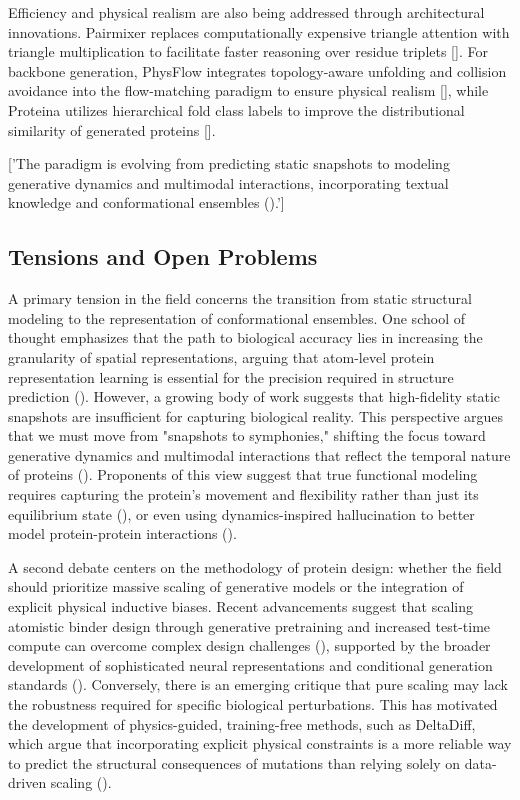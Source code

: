 \documentclass[11pt]{article}
\begin{document}
Efficiency and physical realism are also being addressed through architectural innovations. Pairmixer replaces computationally expensive triangle attention with triangle multiplication to facilitate faster reasoning over residue triplets [\citep{2510.18870}]. For backbone generation, PhysFlow integrates topology-aware unfolding and collision avoidance into the flow-matching paradigm to ensure physical realism [\citep{2509.25379}], while Proteina utilizes hierarchical fold class labels to improve the distributional similarity of generated proteins [\citep{2503.00710}].

['The paradigm is evolving from predicting static snapshots to modeling generative dynamics and multimodal interactions, incorporating textual knowledge and conformational ensembles (\citep{2603.18505}).']


\subsection{Tensions and Open Problems}

A primary tension in the field concerns the transition from static structural modeling to the representation of conformational ensembles. One school of thought emphasizes that the path to biological accuracy lies in increasing the granularity of spatial representations, arguing that atom-level protein representation learning is essential for the precision required in structure prediction (\citep{2605.22133}). However, a growing body of work suggests that high-fidelity static snapshots are insufficient for capturing biological reality. This perspective argues that we must move from "snapshots to symphonies," shifting the focus toward generative dynamics and multimodal interactions that reflect the temporal nature of proteins (\citep{2603.18505}). Proponents of this view suggest that true functional modeling requires capturing the protein's movement and flexibility rather than just its equilibrium state (\citep{2606.08647}), or even using dynamics-inspired hallucination to better model protein-protein interactions (\citep{2601.06214}).

A second debate centers on the methodology of protein design: whether the field should prioritize massive scaling of generative models or the integration of explicit physical inductive biases. Recent advancements suggest that scaling atomistic binder design through generative pretraining and increased test-time compute can overcome complex design challenges (\citep{2603.27950}), supported by the broader development of sophisticated neural representations and conditional generation standards (\citep{2603.26378}). Conversely, there is an emerging critique that pure scaling may lack the robustness required for specific biological perturbations. This has motivated the development of physics-guided, training-free methods, such as DeltaDiff, which argue that incorporating explicit physical constraints is a more reliable way to predict the structural consequences of mutations than relying solely on data-driven scaling (\citep{2606.04452}).
\end{document}
